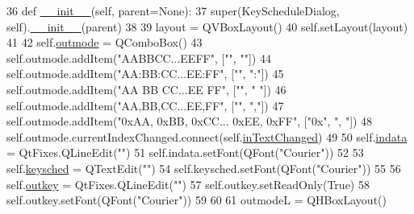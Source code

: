 \begin{DoxyCode}
36     \textcolor{keyword}{def }\hyperlink{classsoftware_1_1chipwhisperer_1_1common_1_1ui_1_1KeyScheduleDialog_1_1KeyScheduleDialog_afdbd67594fb1272d5e9d89e7d0e72a56}{\_\_init\_\_}(self, parent=None):
37         super(KeyScheduleDialog, self).\hyperlink{classsoftware_1_1chipwhisperer_1_1common_1_1ui_1_1KeyScheduleDialog_1_1KeyScheduleDialog_afdbd67594fb1272d5e9d89e7d0e72a56}{\_\_init\_\_}(parent)
38 
39         layout = QVBoxLayout()
40         self.setLayout(layout)
41 
42         self.\hyperlink{classsoftware_1_1chipwhisperer_1_1common_1_1ui_1_1KeyScheduleDialog_1_1KeyScheduleDialog_ac9f84960ed192212c88c3ce3beab65e5}{outmode} = QComboBox()
43         self.outmode.addItem(\textcolor{stringliteral}{"AABBCC...EEFF"}, [\textcolor{stringliteral}{""}, \textcolor{stringliteral}{""}])
44         self.outmode.addItem(\textcolor{stringliteral}{"AA:BB:CC...EE:FF"}, [\textcolor{stringliteral}{""}, \textcolor{stringliteral}{":"}])
45         self.outmode.addItem(\textcolor{stringliteral}{"AA BB CC...EE FF"}, [\textcolor{stringliteral}{""}, \textcolor{stringliteral}{" "}])
46         self.outmode.addItem(\textcolor{stringliteral}{"AA,BB,CC...EE,FF"}, [\textcolor{stringliteral}{""}, \textcolor{stringliteral}{","}])
47         self.outmode.addItem(\textcolor{stringliteral}{"0xAA, 0xBB, 0xCC... 0xEE, 0xFF"}, [\textcolor{stringliteral}{"0x"}, \textcolor{stringliteral}{", "}])
48         self.outmode.currentIndexChanged.connect(self.\hyperlink{classsoftware_1_1chipwhisperer_1_1common_1_1ui_1_1KeyScheduleDialog_1_1KeyScheduleDialog_ac2575bc805f4fd64d0aeb4b4e7558e3d}{inTextChanged})
49 
50         self.\hyperlink{classsoftware_1_1chipwhisperer_1_1common_1_1ui_1_1KeyScheduleDialog_1_1KeyScheduleDialog_a10bbf83fdd1bad21a7c6a23979bf67f5}{indata} = QtFixes.QLineEdit(\textcolor{stringliteral}{""})
51         self.indata.setFont(QFont(\textcolor{stringliteral}{"Courier"}))
52 
53         self.\hyperlink{classsoftware_1_1chipwhisperer_1_1common_1_1ui_1_1KeyScheduleDialog_1_1KeyScheduleDialog_a247b0a323e4f2541203896afa0b25950}{keysched} = QTextEdit(\textcolor{stringliteral}{""})
54         self.keysched.setFont(QFont(\textcolor{stringliteral}{"Courier"}))
55 
56         self.\hyperlink{classsoftware_1_1chipwhisperer_1_1common_1_1ui_1_1KeyScheduleDialog_1_1KeyScheduleDialog_a42b500f9ca375483f89049cdece0c11d}{outkey} = QtFixes.QLineEdit(\textcolor{stringliteral}{""})
57         self.outkey.setReadOnly(\textcolor{keyword}{True})
58         self.outkey.setFont(QFont(\textcolor{stringliteral}{"Courier"}))
59 
60 
61         outmodeL = QHBoxLayout()

\end{DoxyCode}
